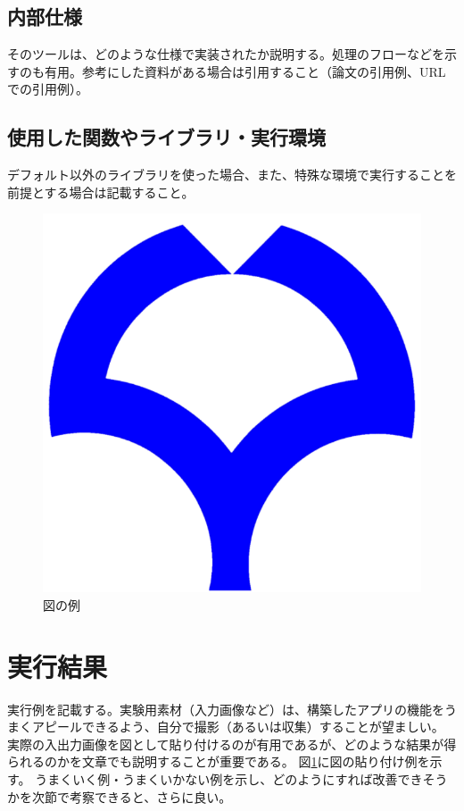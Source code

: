 \documentclass[twocolumn, a4paper]{jsarticle}
\begin{document}
\subsection{内部仕様}
そのツールは、どのような仕様で実装されたか説明する。処理のフローなどを示すのも有用。参考にした資料がある場合は引用すること（論文の引用例\cite{canny}、URLでの引用例\cite{material}）。

\subsection{使用した関数やライブラリ・実行環境}
デフォルト以外のライブラリを使った場合、また、特殊な環境で実行することを前提とする場合は記載すること。

\begin{figure}[t]
\centering
\includegraphics[width=\linewidth]{ou.png}
\caption{図の例}
\label{fig:ou}
\end{figure}

\section{実行結果}
実行例を記載する。実験用素材（入力画像など）は、構築したアプリの機能をうまくアピールできるよう、自分で撮影（あるいは収集）することが望ましい。
実際の入出力画像を図として貼り付けるのが有用であるが、どのような結果が得られるのかを文章でも説明することが重要である。
図\ref{fig:ou}に図の貼り付け例を示す。
うまくいく例・うまくいかない例を示し、どのようにすれば改善できそうかを次節で考察できると、さらに良い。
\end{document}
